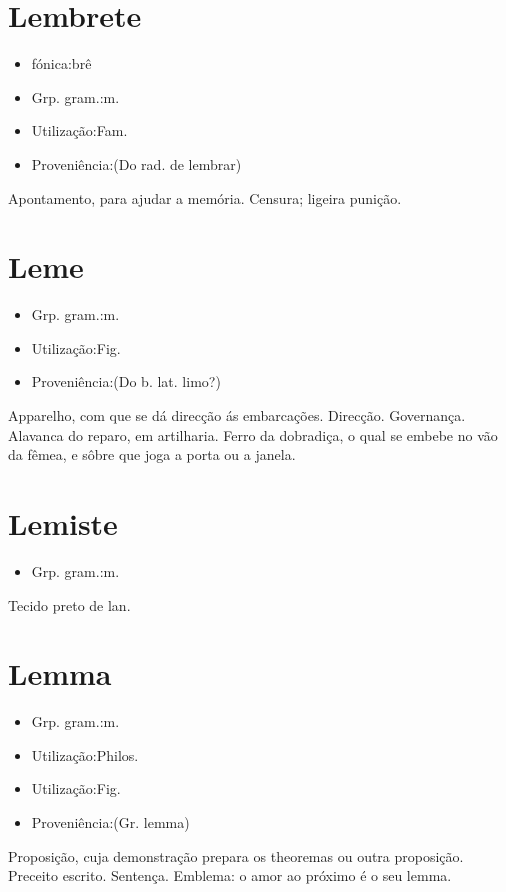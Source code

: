 \section{Lembrete}
\begin{itemize}
\item {fónica:brê}
\end{itemize}
\begin{itemize}
\item {Grp. gram.:m.}
\end{itemize}
\begin{itemize}
\item {Utilização:Fam.}
\end{itemize}
\begin{itemize}
\item {Proveniência:(Do rad. de \textunderscore lembrar\textunderscore )}
\end{itemize}
Apontamento, para ajudar a memória.
Censura; ligeira punição.
\section{Leme}
\begin{itemize}
\item {Grp. gram.:m.}
\end{itemize}
\begin{itemize}
\item {Utilização:Fig.}
\end{itemize}
\begin{itemize}
\item {Proveniência:(Do b. lat. \textunderscore limo\textunderscore ?)}
\end{itemize}
Apparelho, com que se dá direcção ás embarcações.
Direcção.
Governança.
Alavanca do reparo, em artilharia.
Ferro da dobradiça, o qual se embebe no vão da fêmea, e sôbre que joga a porta ou a janela.
\section{Lemiste}
\begin{itemize}
\item {Grp. gram.:m.}
\end{itemize}
Tecido preto de lan.
\section{Lemma}
\begin{itemize}
\item {Grp. gram.:m.}
\end{itemize}
\begin{itemize}
\item {Utilização:Philos.}
\end{itemize}
\begin{itemize}
\item {Utilização:Fig.}
\end{itemize}
\begin{itemize}
\item {Proveniência:(Gr. \textunderscore lemma\textunderscore )}
\end{itemize}
Proposição, cuja demonstração prepara os theoremas ou outra proposição.
Preceito escrito.
Sentença.
Emblema: \textunderscore o amor ao próximo é o seu lemma\textunderscore .
